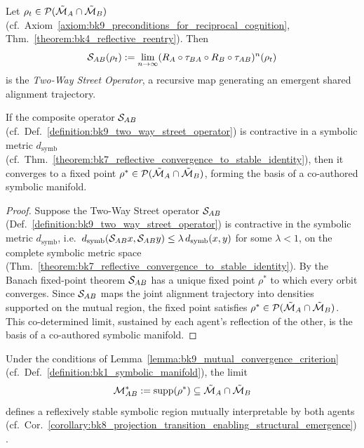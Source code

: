 \begin{definition}
\label{definition:bk9_two_way_street_operator}
Let \( \rho_t \in \mathcal{P}(\tilde{\mathcal{M}}_A \cap \tilde{\mathcal{M}}_B) \) (cf.~Axiom~\ref{axiom:bk9_preconditions_for_reciprocal_cognition}, Thm.~\ref{theorem:bk4_reflective_reentry}). Then
\[
\mathcal{S}_{AB}(\rho_t) := \lim_{n \to \infty} (R_A \circ \tau_{BA} \circ R_B \circ \tau_{AB})^n(\rho_t)
\]
is the \emph{Two-Way Street Operator}, a recursive map generating an emergent shared alignment trajectory.
\end{definition}
\begin{lemma}
\label{lemma:bk9_mutual_convergence_criterion}
If the composite operator \( \mathcal{S}_{AB} \) (cf.~Def.~\ref{definition:bk9_two_way_street_operator}) is contractive in a symbolic metric \( d_\text{symb} \) (cf.~Thm.~\ref{theorem:bk7_reflective_convergence_to_stable_identity}), then it converges to a fixed point \( \rho^* \in \mathcal{P}(\tilde{\mathcal{M}}_A \cap \tilde{\mathcal{M}}_B) \), forming the basis of a co-authored symbolic manifold.
\end{lemma}
\begin{proof}
\label{proof:bk9_mutual_convergence_criterion}
\leavevmode
Suppose the Two-Way Street operator $\mathcal{S}_{AB}$ (Def.~\ref{definition:bk9_two_way_street_operator}) is contractive in the symbolic metric $d_{\text{symb}}$, i.e.\ $d_{\text{symb}}(\mathcal{S}_{AB}x,\mathcal{S}_{AB}y)\le\lambda\,d_{\text{symb}}(x,y)$ for some $\lambda<1$, on the complete symbolic metric space (Thm.~\ref{theorem:bk7_reflective_convergence_to_stable_identity}). By the Banach fixed-point theorem $\mathcal{S}_{AB}$ has a unique fixed point $\rho^*$ to which every orbit converges. Since $\mathcal{S}_{AB}$ maps the joint alignment trajectory into densities supported on the mutual region, the fixed point satisfies $\rho^*\in\mathcal{P}(\tilde{\mathcal{M}}_A\cap\tilde{\mathcal{M}}_B)$. This co-determined limit, sustained by each agent's reflection of the other, is the basis of a co-authored symbolic manifold.
\end{proof}
\begin{proposition}
\label{proposition:bk9_emergence_of_shared_manifold}
Under the conditions of Lemma~\ref{lemma:bk9_mutual_convergence_criterion} (cf.~Def.~\ref{definition:bk1_symbolic_manifold}), the limit
\[
\mathcal{M}_{AB}^* := \operatorname{supp}(\rho^*) \subseteq \tilde{\mathcal{M}}_A \cap \tilde{\mathcal{M}}_B
\]
defines a reflexively stable symbolic region mutually interpretable by both agents (cf.~Cor.~\ref{corollary:bk8_projection_transition_enabling_structural_emergence}).
\end{proposition}
